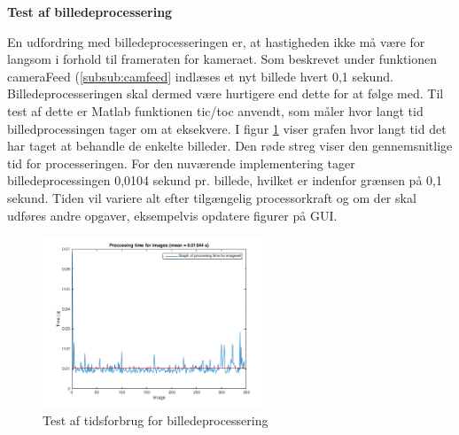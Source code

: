 \newpage
\textbf{Test af billedeprocessering}

En udfordring med billedeprocesseringen er, at hastigheden ikke må være for langsom i forhold til frameraten for kameraet. Som beskrevet under funktionen cameraFeed (\ref{subsub:camfeed} indlæses et nyt billede hvert 0,1 sekund. Billedeprocesseringen skal dermed være hurtigere end dette for at følge med. Til test af dette er Matlab funktionen tic/toc anvendt, som måler hvor langt tid billedprocessingen tager om at eksekvere. I figur \ref{fig:dataprocess} viser grafen hvor langt tid det har taget at behandle de enkelte billeder. Den røde streg viser den gennemsnitlige tid for processeringen. For den nuværende implementering tager billedeprocessingen 0,0104 sekund pr. billede, hvilket er indenfor grænsen på 0,1 sekund. Tiden vil variere alt efter tilgængelig processorkraft og om der skal udføres andre opgaver, eksempelvis opdatere figurer på GUI. 

\begin{figure}[H]
	\centering
	\includegraphics[width=0.6\textwidth]{billeder/software/dataprocessing_2.png}
	\caption{Test af tidsforbrug for billedeprocessering}
	\label{fig:dataprocess}
\end{figure}
